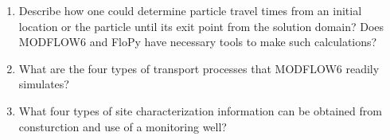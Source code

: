 \documentclass[12pt]{article}
\begin{document}
\begin{enumerate}
\item Describe how one could determine particle travel times from an initial location or the particle until its exit point from the solution domain?  Does MODFLOW6 and FloPy have necessary tools to make such calculations?  
\item What are the four types of transport processes that MODFLOW6 readily simulates? 
\item What four types of site characterization information can be obtained from consturction and use of a monitoring well?

\end{enumerate}
\end{document}
